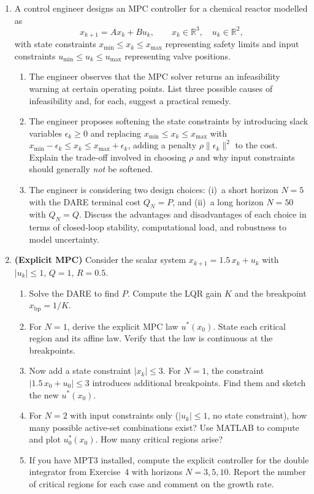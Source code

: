 \begin{enumerate}
\item A control engineer designs an MPC controller for a chemical reactor modelled as
\[
x_{k+1} = A x_k + B u_k, \qquad x_k \in \mathbb{R}^3, \quad u_k \in \mathbb{R}^2,
\]
with state constraints $x_{\min} \le x_k \le x_{\max}$ representing safety limits and input constraints $u_{\min} \le u_k \le u_{\max}$ representing valve positions.
\begin{enumerate}
	\item The engineer observes that the MPC solver returns an infeasibility warning at certain operating points. List three possible causes of infeasibility and, for each, suggest a practical remedy.
	\item The engineer proposes softening the state constraints by introducing slack variables $\epsilon_k \ge 0$ and replacing $x_{\min} \le x_k \le x_{\max}$ with $x_{\min} - \epsilon_k \le x_k \le x_{\max} + \epsilon_k$, adding a penalty $\rho \|\epsilon_k\|^2$ to the cost. Explain the trade-off involved in choosing $\rho$ and why input constraints should generally \emph{not} be softened.
	\item The engineer is considering two design choices: (i)~a short horizon $N = 5$ with the DARE terminal cost $Q_N = P$, and (ii)~a long horizon $N = 50$ with $Q_N = Q$. Discuss the advantages and disadvantages of each choice in terms of closed-loop stability, computational load, and robustness to model uncertainty.
\end{enumerate}

\item \textbf{(Explicit MPC)} Consider the scalar system $x_{k+1} = 1.5\,x_k + u_k$ with $|u_k| \le 1$, $Q = 1$, $R = 0.5$.
\begin{enumerate}
	\item Solve the DARE to find $P$. Compute the LQR gain $K$ and the breakpoint $x_{\text{bp}} = 1/K$.
	\item For $N = 1$, derive the explicit MPC law $u^*(x_0)$. State each critical region and its affine law. Verify that the law is continuous at the breakpoints.
	\item Now add a state constraint $|x_k| \le 3$. For $N = 1$, the constraint $|1.5\,x_0 + u_0| \le 3$ introduces additional breakpoints. Find them and sketch the new $u^*(x_0)$.
	\item For $N = 2$ with input constraints only ($|u_k| \le 1$, no state constraint), how many possible active-set combinations exist? Use MATLAB to compute and plot $u_0^*(x_0)$. How many critical regions arise?
	\item If you have MPT3 installed, compute the explicit controller for the double integrator from Exercise~4 with horizons $N = 3, 5, 10$. Report the number of critical regions for each case and comment on the growth rate.
\end{enumerate}

\end{enumerate}

